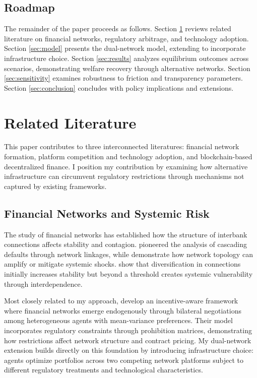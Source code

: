 \documentclass[12pt]{article}
\begin{document}
\subsection{Roadmap}

The remainder of the paper proceeds as follows. Section \ref{sec:literature} reviews related literature on financial networks, regulatory arbitrage, and technology adoption. Section \ref{sec:model} presents the dual-network model, extending \citet{jalan_incentive-aware_2024} to incorporate infrastructure choice. Section \ref{sec:results} analyzes equilibrium outcomes across scenarios, demonstrating welfare recovery through alternative networks. Section \ref{sec:sensitivity} examines robustness to friction and transparency parameters. Section \ref{sec:conclusion} concludes with policy implications and extensions.


\section{Related Literature}
\label{sec:literature}

This paper contributes to three interconnected literatures: financial network formation, platform competition and technology adoption, and blockchain-based decentralized finance. I position my contribution by examining how alternative infrastructure can circumvent regulatory restrictions through mechanisms not captured by existing frameworks.

\subsection{Financial Networks and Systemic Risk}

The study of financial networks has established how the structure of interbank connections affects stability and contagion. \citet{eisenberg_systemic_2001} pioneered the analysis of cascading defaults through network linkages, while \citet{elliott_financial_2014} demonstrate how network topology can amplify or mitigate systemic shocks. \citet{acemoglu_systemic_2015} show that diversification in connections initially increases stability but beyond a threshold creates systemic vulnerability through interdependence.

Most closely related to my approach, \citet{jalan_incentive-aware_2024} develop an incentive-aware framework where financial networks emerge endogenously through bilateral negotiations among heterogeneous agents with mean-variance preferences. Their model incorporates regulatory constraints through prohibition matrices, demonstrating how restrictions affect network structure and contract pricing. My dual-network extension builds directly on this foundation by introducing infrastructure choice: agents optimize portfolios across two competing network platforms subject to different regulatory treatments and technological characteristics.
\end{document}
